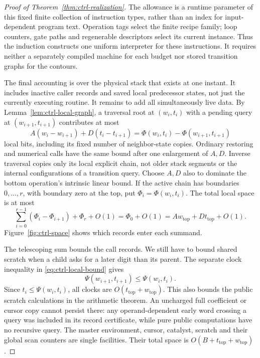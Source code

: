 \begin{proof}[Proof of Theorem~\ref{thm:ctrl-realization}]
The allowance is a runtime parameter of this fixed finite collection of
instruction types, rather than an index for input-dependent program
text.  Operation tags select the finite recipe family; loop counters,
gate paths and regenerable descriptors select its current instance.
Thus the induction constructs one uniform interpreter for these
instructions.  It requires neither a separately compiled machine for
each budget nor stored transition graphs for the contours.

The final accounting is over the physical stack that exists at one instant. It includes inactive caller records and saved local predecessor states, not just the currently executing routine. It remains to add all simultaneously live data.  By
Lemma~\ref{lem:ctrl-local-graph}, a traversal root at $(w_i,t_i)$ with a
pending query at $(w_{i+1},t_{i+1})$ contributes at most
\begin{equation}\label{eq:ctrl-stack-segment}
 A(w_i-w_{i+1})+D(t_i-t_{i+1})
 =\Phi(w_i,t_i)-\Phi(w_{i+1},t_{i+1})
\end{equation}
local bits, including its fixed number of neighbor-state copies.
Ordinary restoring and numerical calls have the same bound after one
enlargement of $A,D$.  Inverse traversal copies only its local explicit
chain, not older stack segments or the internal configurations of a
transition query.  Choose $A,D$ also to dominate the bottom operation's
intrinsic linear bound.  If the active chain has boundaries
$0,\ldots,r$, with boundary zero at the top, put
$\Phi_i=\Phi(w_i,t_i)$.  The total local space is at most
\[
 \sum_{i=0}^{r-1}(\Phi_i-\Phi_{i+1})+\Phi_r+O(1)
 =\Phi_0+O(1)
 =Aw_{\mathrm{top}}+Dt_{\mathrm{top}}+O(1).
\]
Figure~\ref{fig:ctrl-space} shows which records enter each summand.



The telescoping sum bounds the call records. We still have to bound shared scratch when a child asks for a later digit than its parent. The separate clock inequality in \eqref{eq:ctrl-local-bound} gives
\begin{equation}\label{eq:ctrl-clock-invariant}
 \Psi(w_{i+1},t_{i+1})\le\Psi(w_i,t_i).
\end{equation}
Since $t_i\le\Psi(w_i,t_i)$, all clocks are
$O(t_{\mathrm{top}}+w_{\mathrm{top}})$.
This also bounds the public scratch calculations in the arithmetic
theorem.  An uncharged full coefficient or cursor copy cannot persist
there: any operand-dependent early word crossing a query was included
in its record certificate, while pure public computations have no
recursive query.  The master environment, cursor, catalyst, scratch
and their global scan counters are single facilities.  Their total
space is $O(B+t_{\mathrm{top}}+w_{\mathrm{top}})$.


\end{proof}
